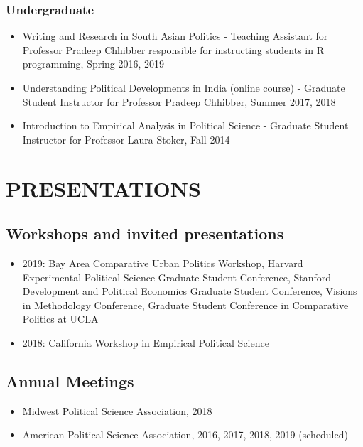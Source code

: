 \documentclass[11pt]{article}
\begin{document}
\subsubsection*{Undergraduate}
\begin{itemize}
		\item[]Writing and Research in South Asian Politics - Teaching Assistant for Professor Pradeep Chhibber responsible for instructing students in \textsf{R} programming, Spring 2016, 2019
	\item[]Understanding Political Developments in India (online course) - Graduate Student Instructor for Professor Pradeep Chhibber, Summer 2017, 2018
	\item[]Introduction to Empirical Analysis in Political Science - Graduate Student Instructor for Professor Laura Stoker, Fall 2014	
\end{itemize}

\vspace{3mm}
\section*{PRESENTATIONS}
\subsection*{Workshops and invited presentations}
\begin{itemize}[nosep]
\item[] 2019: Bay Area Comparative Urban Politics Workshop, Harvard Experimental Political Science Graduate Student Conference, Stanford Development and Political Economics Graduate Student Conference, Visions in Methodology Conference, Graduate Student Conference in Comparative Politics at UCLA 


\item[] 2018: California Workshop in Empirical Political Science
\end{itemize}
\subsection*{Annual Meetings}

\begin{itemize}[nosep]
\item[]Midwest Political Science Association, 2018
	\item[]American Political Science Association, 2016, 2017, 2018, 2019 (scheduled)
	
	
	
\end{itemize}
\end{document}
